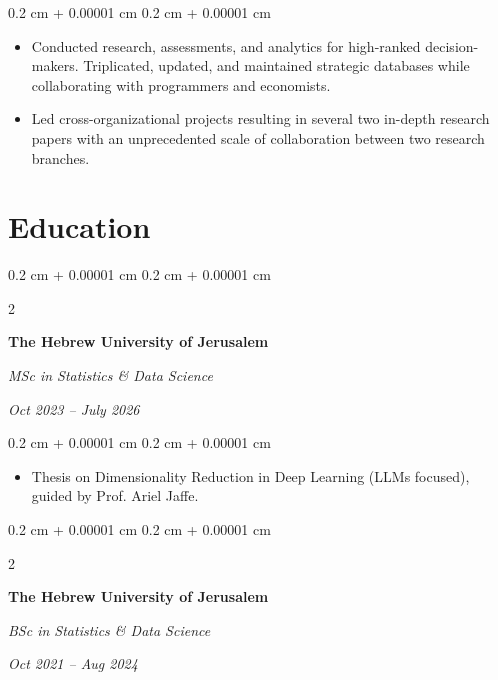 \documentclass[10pt, letterpaper]{article}
\newenvironment{highlights}{
    \begin{itemize}[
        topsep=0.10 cm,
        parsep=0.10 cm,
        partopsep=0pt,
        itemsep=0pt,
        leftmargin=0.4 cm + 10pt
    ]
}{
    \end{itemize}
} %
\newenvironment{onecolentry}{
    \begin{adjustwidth}{
        0.2 cm + 0.00001 cm
    }{
        0.2 cm + 0.00001 cm
    }
}{
    \end{adjustwidth}
} %
\newenvironment{twocolentry}[2][]{
    \onecolentry
    \def\secondColumn{#2}
    \setcolumnwidth{\fill, 4.5 cm}
    \begin{paracol}{2}
}{
    \switchcolumn \raggedleft \secondColumn
    \end{paracol}
    \endonecolentry
} %
\begin{document}
        \vspace{0.10 cm}
        \begin{onecolentry}
            \begin{highlights}
                \item Conducted research, assessments, and analytics for high-ranked decision-makers. Triplicated, updated, and maintained strategic databases while collaborating with programmers and economists.
                \item Led cross-organizational projects resulting in several two in-depth research papers with an unprecedented scale of collaboration between two research branches.
            \end{highlights}
        \end{onecolentry}



    
    \section{Education}



        
        \begin{twocolentry}{
            
            
        \textit{Oct 2023 – July 2026}}
            \textbf{The Hebrew University of Jerusalem}

            \textit{MSc in Statistics \& Data Science}
        \end{twocolentry}

        \vspace{0.10 cm}
        \begin{onecolentry}
            \begin{highlights}
                \item Thesis on Dimensionality Reduction in Deep Learning (LLMs focused), guided by Prof. Ariel Jaffe.
            \end{highlights}
        \end{onecolentry}


        \vspace{0.2 cm}

        \begin{twocolentry}{
            
            
        \textit{Oct 2021 – Aug 2024}}
            \textbf{The Hebrew University of Jerusalem}

            \textit{BSc in Statistics \& Data Science}
        \end{twocolentry}
\end{document}
